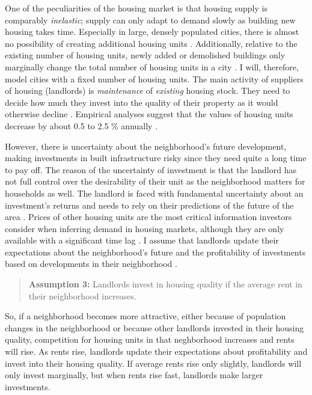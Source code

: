 \documentclass[a4paper,12pt]{article}
\begin{document}
One of the peculiarities of the housing market is that housing supply is comparably \textit{inelastic}; supply can only adapt to demand slowly as building new housing takes time. Especially in large, densely populated cities, there is almost no possibility of creating additional housing units \citep{baum-snowConstraintsCityNeighborhood2023}. Additionally, relative to the existing number of housing units, newly added or demolished buildings only marginally change the total number of housing units in a city \citep[1569]{whiteheadUrbanHousingMarkets1999}. I will, therefore, model cities with a fixed number of housing units. The main activity of suppliers of housing (landlords) is \textit{maintenance} of \textit{existing} housing stock. They need to decide how much they invest into the quality of their property as it would otherwise decline \citep[119]{bruecknerLecturesUrbanEconomics2011}. Empirical analyses suggest that the values of housing units decrease by about 0.5 to 2.5 \% annually \citep[1086]{rosenthalChangePersistenceEconomic2015}.

However, there is uncertainty about the neighborhood's future development, making investments in built infrastructure risky since they need quite a long time to pay off. The reason of the uncertainty of investment is that the landlord has not full control over the desirability of their unit as the neighborhood matters for households as well. The landlord is faced with fundamental uncertainty about an investment's returns and needs to rely on their predictions of the future of the area \citep{whiteheadUrbanHousingMarkets1999, galsterNatureNeighbourhood2001, glaeserExtrapolativeModelHouse2017}. Prices of other housing units are the most critical information investors consider when inferring demand in housing markets, although they are only available with a significant time lag \citep{glaeserExtrapolativeModelHouse2017}. I assume that landlords update their expectations about the neighborhood's future and the profitability of investments based on developments in their neighborhood \citep{galsterNatureNeighbourhood2001, bayerSpeculativeFeverInvestor2021}. 

\begin{quotation}
\textbf{Assumption 3:} Landlords invest in housing quality if the average rent in their neighborhood increases.
\end{quotation}

So, if a neighborhood becomes more attractive, either because of population changes in the neighborhood or because other landlords invested in their housing quality, competition for housing units in that neghborhood increases and rents will rise. As rents rise, landlords update their expectations about profitability and invest into their housing quality. If average rents rise only slightly, landlords will only invest marginally, but when rents rise fast, landlords make larger investments.
\end{document}
